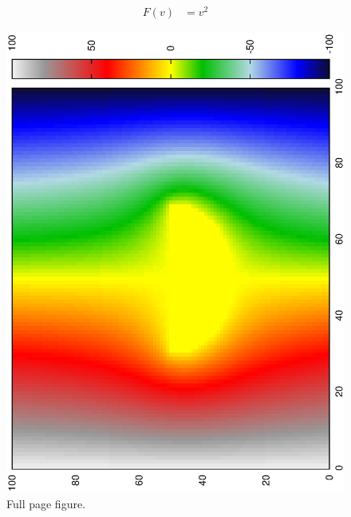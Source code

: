 \documentclass[aps,twocolumn,pre,nofootinbib]{revtex4-1}
\begin{document}
\begin{equation}
\begin{split}
F(v) &= v^2 
\end{split}
\label{Simple example}
\end{equation}



\begin{figure}

\includegraphics*[width= 1.6 \columnwidth]{circle.ps} 
\caption{Full page figure.
}
\label{fig:Full}
\end{figure}
\end{document}
